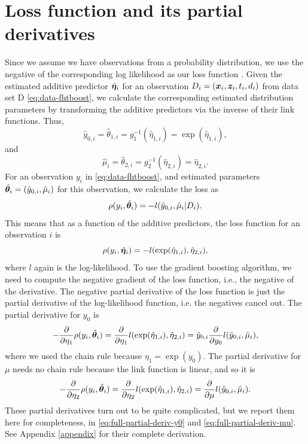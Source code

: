 \section{Loss function and its partial derivatives}
Since we assume we have observations from a probability distribution, we use the negative of the corresponding log likelihood as our loss function \citep{mayr14a}.
Given the estimated additive predictor $\hat{\boldsymbol{\eta}}_i$ for an observation $D_i=(\bm{x}_i,\bm{z}_i,t_i,d_i)$ from data set D \eqref{eq:data-fhtboost}, we calculate the corresponding estimated distribution parameters by transforming the additive predictors via the inverse of their link functions.
Thus,
\begin{equation}
    \hat{y}_{0,i}=\hat{\theta}_{1,i}=g_1^{-1}(\hat{\eta}_{1,i})=\exp(\hat{\eta}_{1,i}),
\end{equation}
and
\begin{equation}
    \hat{\mu}_i=\hat{\theta}_{2,i}=g_2^{-1}(\hat{\eta}_{2,i})=\hat{\eta}_{2,i}.
\end{equation}
For an observation $y_i$ in \eqref{eq:data-fhtboost}, and estimated parameters $\hat{\boldsymbol{\theta}}_i=\left(\hat{y}_{0,i},\hat{\mu}_i\right)$ for this observation, we calculate the loss as
\begin{equation*}
    \rho(y_i,\hat{\boldsymbol{\theta}}_i)=-l(\hat{y}_{0,i},\hat{\mu}_i|D_i).
\end{equation*}
This means that as a function of the additive predictors, the loss function for an observation $i$ is
\begin{equation*}
    \rho(y_i,\hat{\boldsymbol{\eta}}_i)=-l(\exp(\hat{\eta}_{1,i}), \hat{\eta}_{2,i}),
\end{equation*}
where $l$ again is the log-likelihood.
To use the gradient boosting algorithm, we need to compute the negative gradient of the loss function, i.e., the negative of the derivative. 
The negative partial derivative of the loss function is just the partial derivative of the log-likelihood function, i.e. the negatives cancel out.
The partial derivative for $y_0$ is
\begin{equation}\label{eq:partial-deriv-y0}
    -\frac{\partial}{\partial\eta_1}\rho(y_i,\hat{\boldsymbol{\theta}}_i)=\frac{\partial}{\partial\eta_1}l(\exp(\hat{\eta}_{1,i}), \hat{\eta}_{2,i})=\hat{y}_{0,i}\frac{\partial}{\partial y_0}l(\hat{y}_{0,i}, \hat{\mu}_{i}),
\end{equation}
where we used the chain rule because $\eta_1=\exp(y_0)$.
The partial derivative for $\mu$ needs no chain rule because the link function is linear, and so it is
\begin{equation}\label{eq:partial-deriv-mu}
    -\frac{\partial}{\partial\eta_2}\rho(y_i,\hat{\boldsymbol{\theta}}_i)=\frac{\partial}{\partial\eta_2}l(\exp(\hat{\eta}_{1,i}), \hat{\eta}_{2,i})
    =\frac{\partial}{\partial \mu}l(\hat{y}_{0,i}, \hat{\mu}_{i}).
\end{equation}
These partial derivatives turn out to be quite complicated, but we report them here for completeness, in \eqref{eq:full-partial-deriv-y0} and \eqref{eq:full-partial-deriv-mu}.
See Appendix \ref{appendix} for their complete derivation.

